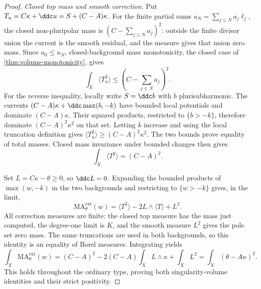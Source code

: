\begin{proof}
\emph{Closed top mass and smooth correction.} Put
$T_u=C\kappa+\ddc u=S+(C-A)\kappa$.
For the finite partial sums $u_N=\sum_{j\leq N}a_j\ell_j$,
the closed non-pluripolar mass is
$(C-\sum_{j\leq N}a_j)^2$: outside the finite divisor union
the current is the smooth residual, and the measure gives
that union zero mass. Since $u_0\leq u_N$, closed-background
mass monotonicity, the closed case of
\cref{thm:volume-monotonicity}, gives
\[
 \int_X\langle T_u^2\rangle
 \leq\left(C-\sum_{j\leq N}a_j\right)^2.
\]
For the reverse inequality, locally write $S=\ddc b$ with
$b$ plurisubharmonic. The currents
$(C-A)\kappa+\ddc\max(b,-k)$ have bounded local potentials
and dominate $(C-A)\kappa$.
Their squared products, restricted to $\{b>-k\}$, therefore
dominate $(C-A)^2\kappa^2$ on that set. Letting $k$ increase
and using the local truncation definition gives
$\langle T_u^2\rangle\geq(C-A)^2\kappa^2$.
The two bounds prove equality of total masses.
Closed mass invariance under bounded changes then gives
\[
 \int_X\langle T^2\rangle=(C-A)^2.
\]

Set $L=C\kappa-\theta\geq0$, so $\ddc L=0$.
Expanding the bounded products of $\max(w,-k)$ in the two
backgrounds and restricting to $\{w>-k\}$ gives, in the limit,
\[
 \mathrm{MA}^{\mathrm{ext}}_\theta(w)
       =\langle T^2\rangle-2L\wedge\langle T\rangle+L^2.
\]
All correction measures are finite: the closed top measure
has the mass just computed, the degree-one limit is $K$, and
the smooth measure $L^2$ gives the pole set zero mass.
The same truncations are used in both backgrounds, so this
identity is an equality of Borel measures.
Integrating yields
\[
 \int_X\mathrm{MA}^{\mathrm{ext}}_\theta(w)
 =(C-A)^2-2(C-A)\int_XL\wedge\kappa+\int_XL^2
 =\int_X(\theta-A\kappa)^2.
\]
This holds throughout the ordinary type, proving both
singularity-volume identities and their strict positivity.
\end{proof}

